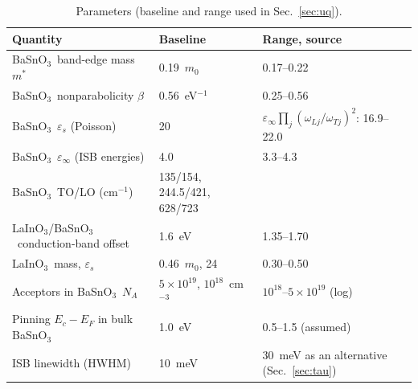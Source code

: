 \documentclass[11pt]{article}
\newcommand{\LIO}{LaInO$_3$}
\newcommand{\BSO}{BaSnO$_3$}
\begin{document}
\begin{table}[t]
\centering\small
\caption{Parameters (baseline and range used in Sec.~\ref{sec:uq}).}\label{tab:par}
\begin{tabular}{lll}
\toprule
Quantity & Baseline & Range, source \\
\midrule
\BSO\ band-edge mass $m^*$ & 0.19~$m_0$ & 0.17--0.22 \cite{Niedermeier2017,Krishnaswamy2017,Aggoune2022} \\
\BSO\ nonparabolicity $\beta$ & 0.56~eV$^{-1}$ & 0.25--0.56 \cite{Niedermeier2017,Krishnaswamy2017} \\
\BSO\ $\varepsilon_s$ (Poisson) & 20 & $\varepsilon_\infty\prod_j(\omega_{Lj}/\omega_{Tj})^2$: 16.9--22.0 \cite{Stanislavchuk2012,Krishnaswamy2017} \\
\BSO\ $\varepsilon_\infty$ (ISB energies) & 4.0 & 3.3--4.3 \cite{Stanislavchuk2012,Krishnaswamy2017,Aggoune2022} \\
\BSO\ TO/LO (cm$^{-1}$) & 135/154, 244.5/421, 628/723 & \cite{Stanislavchuk2012} \\
\LIO/\BSO\ conduction-band offset & 1.6~eV & 1.35--1.70 \cite{Kim2019LIO,Lee2024LIO,Aggoune2021} \\
\LIO\ mass, $\varepsilon_s$ & 0.46~$m_0$, 24 & 0.30--0.50 \cite{Kim2019LIO,Aggoune2021,Jang2017LIO} \\
Acceptors in \BSO\ $N_A$ & $5\times10^{19}$, $10^{18}$~cm$^{-3}$ & $10^{18}$--$5\times10^{19}$ (log) \cite{Kim2019LIO} \\
Pinning $E_c-E_F$ in bulk \BSO & 1.0~eV & 0.5--1.5 (assumed) \\
ISB linewidth (HWHM) & 10~meV & 30~meV as an alternative (Sec.~\ref{sec:tau}) \\
\bottomrule
\end{tabular}
\end{table}
\end{document}
